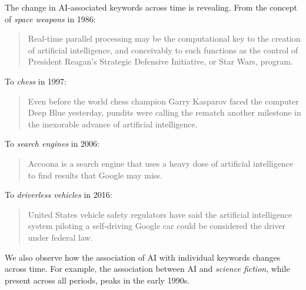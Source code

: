 \documentclass[letterpaper]{article}
\begin{document}
The change in AI-associated keywords across time is revealing. From the concept of \textit{space weapons} in 1986:
\begin{quote}
\small
Real-time parallel processing may be the computational key to the creation of artificial intelligence, and conceivably to such functions as the control of President Reagan's Strategic Defensive Initiative, or Star Wars, program.
\normalsize
\end{quote}
To \textit{chess} in 1997:
\begin{quote}
\small
Even before the world chess champion Garry Kasparov faced the computer Deep Blue yesterday, pundits were calling the rematch another milestone in the inexorable advance of artificial intelligence.
\normalsize
\end{quote}
To \textit{search engines} in 2006:
\begin{quote}
\small
Accoona is a search engine that uses a heavy dose of artificial intelligence to find results that Google may miss.
\normalsize
\end{quote}
To \textit{driverless vehicles} in 2016:
\begin{quote}
\small
United States vehicle safety regulators have said the artificial intelligence system piloting a self-driving Google car could be considered the driver under federal law.
\normalsize
\end{quote}

We also observe how the association of AI with individual keywords changes across time. For example, the association between AI and \textit{science fiction}, while present across all periods, peaks in the early 1990s. %


\end{document}
